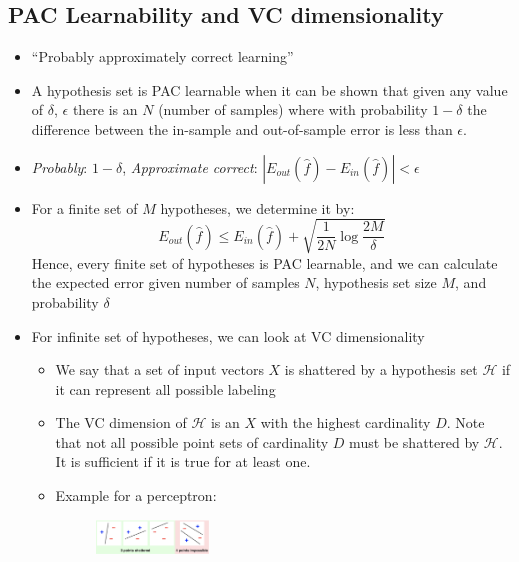 \subsection{PAC Learnability and VC dimensionality}
\begin{itemize}
	\item ``Probably approximately correct learning''
	\item A hypothesis set is PAC learnable when it can be shown that given any value of $\delta$, $\epsilon$ there is an $N$ (number of samples) where with probability $1-\delta$ the difference between the in-sample and out-of-sample error is less than $\epsilon$. 
	\item \textit{Probably}: $1-\delta$, \textit{Approximate correct}: $|E_{out}(\hat{f}) - E_{in}(\hat{f})| < \epsilon$ 
	\item For a finite set of $M$ hypotheses, we determine it by:
	$$E_{out}(\hat{f}) \leq E_{in}(\hat{f}) + \sqrt{\frac{1}{2N}\log \frac{2M}{\delta}}$$
	Hence, every finite set of hypotheses is PAC learnable, and we can calculate the expected error given number of samples $N$, hypothesis set size $M$, and probability $\delta$
	\item For infinite set of hypotheses, we can look at VC dimensionality
	\begin{itemize}
		\item We say that a set of input vectors $X$ is shattered by a hypothesis set $\mathcal{H}$ if it can represent all possible labeling
		\item The VC dimension of $\mathcal{H}$ is an $X$ with the highest cardinality $D$. Note that not all possible point sets of cardinality $D$ must be shattered by $\mathcal{H}$. It is sufficient if it is true for at least one. 
		\item Example for a perceptron:
		\begin{figure}[ht!]
			\centering
			\includegraphics[width=0.3\textwidth]{figures/chapter_6_VC_dimensions.png}
		\end{figure}
	

\end{itemize}
\end{itemize}

